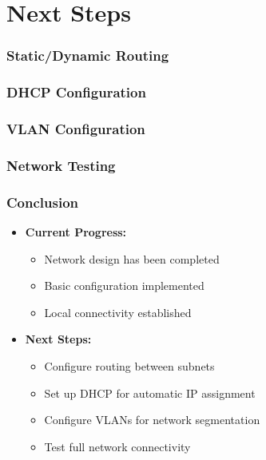 \documentclass{beamer}
\begin{document}
\section{Next Steps}
\begin{frame}[label=routing]
\frametitle{Static/Dynamic Routing}
\end{frame}

\begin{frame}[label=dhcp]
\frametitle{DHCP Configuration}
\end{frame}

\begin{frame}[label=vlans]
\frametitle{VLAN Configuration}
\end{frame}

\begin{frame}[label=testing]
\frametitle{Network Testing}
\end{frame}

\begin{frame}
\frametitle{Conclusion}
\begin{itemize}
    \item \textbf{Current Progress:}
    \begin{itemize}
        \item Network design has been completed
        \item Basic configuration implemented
        \item Local connectivity established
    \end{itemize}
    \item \textbf{Next Steps:}
    \begin{itemize}
        \item Configure routing between subnets
        \item Set up DHCP for automatic IP assignment
        \item Configure VLANs for network segmentation
        \item Test full network connectivity
    \end{itemize}
\end{itemize}
\end{frame}
\end{document}
